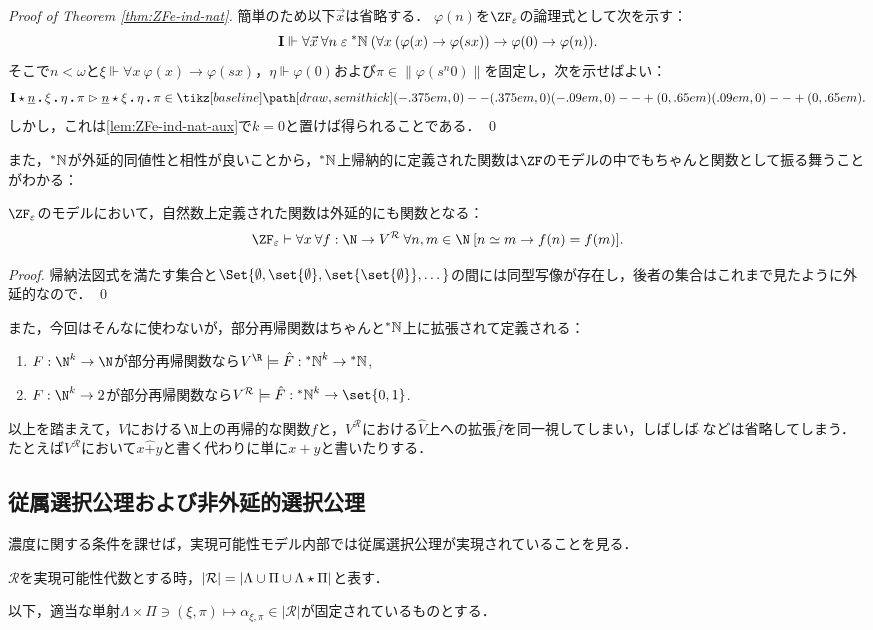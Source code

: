 \documentclass[realisability.tex]{subfiles}
\begin{document}
\begin{proof}[Proof of Theorem \ref{thm:ZFe-ind-nat}]
 簡単のため以下$\vec{x}$は省略する．
 $\varphi(n)$を$\ZF_{\varepsilon}$の論理式として次を示す：
  \[
  \mathsf{\mathbf{I}} \Vdash \forall \vec{x}\: \forall n \mathrel{\varepsilon} \mathord{{}^{*}\mathbb{N}} \:(\forall x\: (\varphi(x) \to \varphi(sx)) \to \varphi(0) \to \varphi(n)).
 \]
 そこで$n < \omega$と$\xi \Vdash \forall x \: \varphi(x) \to \varphi(s x)$，$\eta \Vdash \varphi(0)$および$\pi \in \|\varphi(s^n 0)\|$を固定し，次を示せばよい：
 \[
  \KVM{{\I}{{\num{n}}} \xi\eta {\pi}} \redsto
  \KVM{{{\num{n}}} \xi \eta \pi} \in \pole.
 \]
 しかし，これは\cref{lem:ZFe-ind-nat-aux}で$k = 0$と置けば得られることである． \qed
\end{proof}

また，$\mathord{{}^{*}\mathbb{N}}$が外延的同値性と相性が良いことから，$\mathord{{}^{*}\mathbb{N}}$上帰納的に定義された関数は$\ZF$のモデルの中でもちゃんと関数として振る舞うことがわかる：

\begin{lemma}\label{lem:nat-func-strong}
 $\ZF_{\varepsilon}$のモデルにおいて，自然数上定義された関数は外延的にも関数となる：
 \[
 \ZFe \vdash \forall x \: \forall f : \N \to V^{\mathcal{R}}\:
 \forall n, m \in \N \: [n \simeq m \to f(n) = f(m)].
 \]
\end{lemma}
\begin{proof}
 帰納法図式を満たす集合と$\Set{ \emptyset, \set{\emptyset}, \set{\set{\emptyset}}, \dots}$の間には同型写像が存在し，後者の集合はこれまで見たように外延的なので． \qed
\end{proof}

また，今回はそんなに使わないが，部分再帰関数はちゃんと$\mathord{{}^{*}\mathbb{N}}$上に拡張されて定義される：
\begin{lemma}\label{lem:recursives-defined}
 \begin{enumerate}
  \item $F: \N^k \to \N$が部分再帰関数なら$V^{\R} \models \hat{F}: \NN^k \to \NN$,
  \item $F: \N^k \to 2$が部分再帰関数なら$V^{\mathcal{R}} \models \hat{F}: \NN^k \to \set{0, 1}$.
 \end{enumerate}
\end{lemma}

以上を踏まえて，$V$における$\N$上の再帰的な関数$f$と，$V^{\mathcal{R}}$における$\hat{V}$上への拡張$\hat{f}$を同一視してしまい，しばしば$\hat{\;}$などは省略してしまう．
たとえば$V^{\mathcal{R}}$において$x \mathbin{\hat{+}} y$と書く代わりに単に$x + y$と書いたりする．

\subsection{従属選択公理および非外延的選択公理}
濃度に関する条件を課せば，実現可能性モデル内部では従属選択公理が実現されていることを見る．
\begin{definition}
 $\mathcal{R}$を実現可能性代数とする時，$|\mathcal{R}| = \left\lvert\Lambda \cup \Pi \cup \Lambda \mathbin{\star} \Pi\right\rvert$と表す．

 以下，適当な単射$\Lambda \times \Pi \ni (\xi, \pi) \mapsto \alpha_{\xi,\pi} \in |\mathcal{R}|$が固定されているものとする．
\end{definition}
\end{document}
